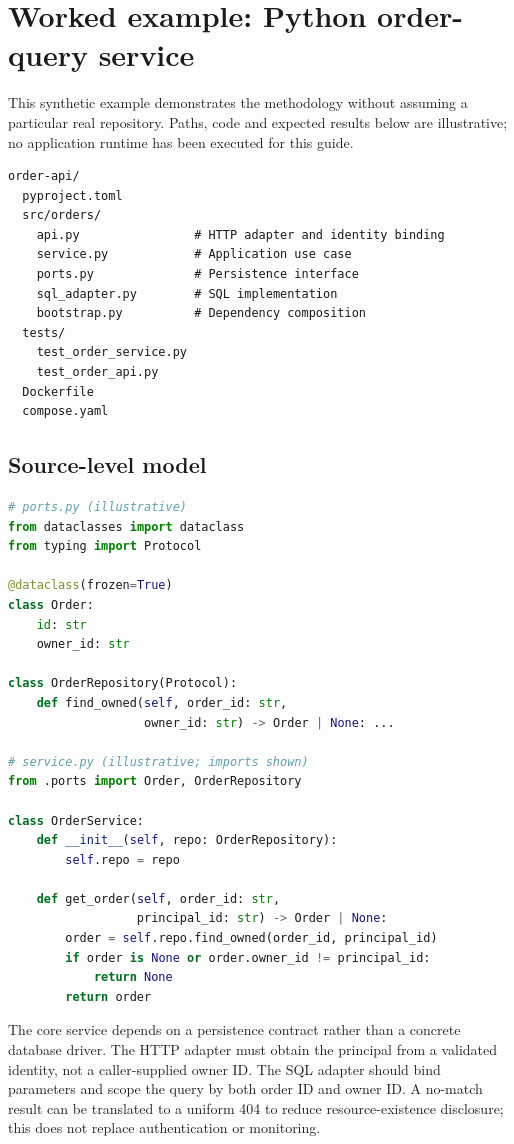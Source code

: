 \documentclass[11pt,letterpaper]{article}
\begin{document}
\section{Worked example: Python order-query service}
This synthetic example demonstrates the methodology without assuming a particular real repository. Paths, code and expected results below are illustrative; no application runtime has been executed for this guide.
\begin{lstlisting}
order-api/
  pyproject.toml
  src/orders/
    api.py                # HTTP adapter and identity binding
    service.py            # Application use case
    ports.py              # Persistence interface
    sql_adapter.py        # SQL implementation
    bootstrap.py          # Dependency composition
  tests/
    test_order_service.py
    test_order_api.py
  Dockerfile
  compose.yaml
\end{lstlisting}
\subsection{Source-level model}
\begin{lstlisting}[language=Python]
# ports.py (illustrative)
from dataclasses import dataclass
from typing import Protocol

@dataclass(frozen=True)
class Order:
    id: str
    owner_id: str

class OrderRepository(Protocol):
    def find_owned(self, order_id: str,
                   owner_id: str) -> Order | None: ...

# service.py (illustrative; imports shown)
from .ports import Order, OrderRepository

class OrderService:
    def __init__(self, repo: OrderRepository):
        self.repo = repo

    def get_order(self, order_id: str,
                  principal_id: str) -> Order | None:
        order = self.repo.find_owned(order_id, principal_id)
        if order is None or order.owner_id != principal_id:
            return None
        return order
\end{lstlisting}
The core service depends on a persistence contract rather than a concrete database driver. The HTTP adapter must obtain the principal from a validated identity, not a caller-supplied owner ID. The SQL adapter should bind parameters and scope the query by both order ID and owner ID. A no-match result can be translated to a uniform 404 to reduce resource-existence disclosure; this does not replace authentication or monitoring.
\clearpage
\end{document}
